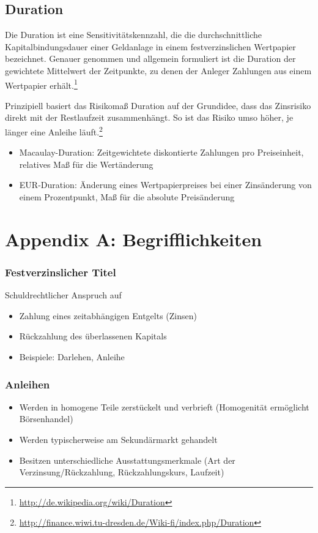 \subsection{Duration}
Die Duration ist eine Sensitivitätskennzahl, die die durchschnittliche Kapitalbindungsdauer einer Geldanlage in einem festverzinslichen Wertpapier bezeichnet. Genauer genommen und allgemein formuliert ist die Duration der gewichtete Mittelwert der Zeitpunkte, zu denen der Anleger Zahlungen aus einem Wertpapier erhält.\footnote{\url{http://de.wikipedia.org/wiki/Duration}}

Prinzipiell basiert das Risikomaß Duration auf der Grundidee, dass das Zinsrisiko direkt mit der Restlaufzeit zusammenhängt. So ist das Risiko umso höher, je länger eine Anleihe läuft.\footnote{\url{http://finance.wiwi.tu-dresden.de/Wiki-fi/index.php/Duration}}
\begin{itemize}
	\item Macaulay-Duration: Zeitgewichtete diskontierte Zahlungen pro Preiseinheit, relatives Maß für die Wertänderung
	\item EUR-Duration: Änderung eines Wertpapierpreises bei einer Zinsänderung von einem Prozentpunkt, Maß für die absolute Preisänderung
\end{itemize}



\section{Appendix A: Begrifflichkeiten}

\subsubsection{Festverzinslicher Titel}
Schuldrechtlicher Anspruch auf
\begin{itemize}
	\item Zahlung eines zeitabhängigen Entgelts (Zinsen)
	\item Rückzahlung des überlassenen Kapitals
	\item Beispiele: Darlehen, Anleihe
\end{itemize}

\subsubsection{Anleihen}
\begin{itemize}
	\item Werden in homogene Teile zerstückelt und verbrieft (Homogenität ermöglicht Börsenhandel)
	\item Werden typischerweise am Sekundärmarkt gehandelt
	\item Besitzen unterschiedliche Ausstattungsmerkmale (Art der Verzinsung/Rückzahlung, Rückzahlungskurs, Laufzeit)
\end{itemize}

